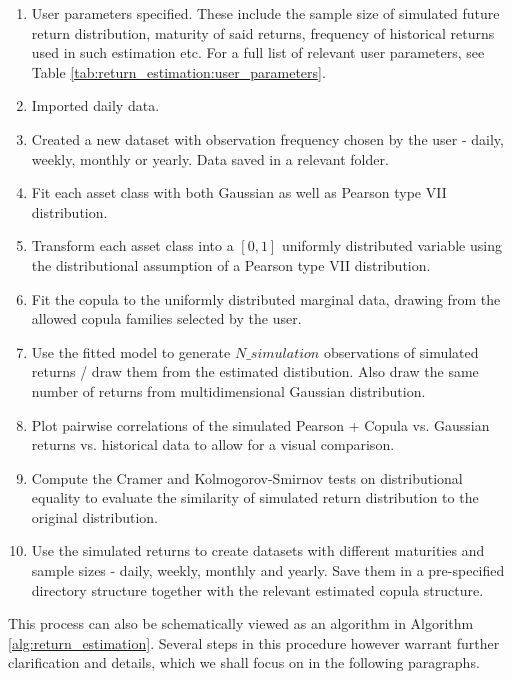 \begin{enumerate}
	\item User parameters specified. These include the sample size of simulated future return distribution, maturity of said returns, frequency of historical returns used in such estimation etc. For a full list of relevant user parameters, see Table \ref{tab:return_estimation:user_parameters}.
	\item Imported daily data.
	\item Created a new dataset with observation frequency chosen by the user - daily, weekly, monthly or yearly. Data saved in a relevant folder.
	\item Fit each asset class with both Gaussian as well as Pearson type VII distribution.
	\item Transform each asset class into a $[0,1]$ uniformly distributed variable using the distributional assumption of a Pearson type VII distribution.
	\item Fit the copula to the uniformly distributed marginal data, drawing from the allowed copula families selected by the user.
	\item Use the fitted model to generate $N\_simulation$ observations of simulated returns / draw them from the estimated distibution. Also draw the same number of returns from multidimensional Gaussian distribution.
	\item Plot pairwise correlations of the simulated Pearson + Copula vs. Gaussian returns vs. historical data to allow for a visual comparison.
	\item Compute the Cramer and Kolmogorov-Smirnov tests on distributional equality to evaluate the similarity of simulated return distribution to the original distribution.
	\item Use the simulated returns to create datasets with different maturities and sample sizes - daily, weekly, monthly and yearly. Save them in a pre-specified directory structure together with the relevant estimated copula structure.
\end{enumerate}

This process can also be schematically viewed as an algorithm in Algorithm \ref{alg:return_estimation}. Several steps in this procedure however warrant further clarification and details, which we shall focus on in the following paragraphs.

